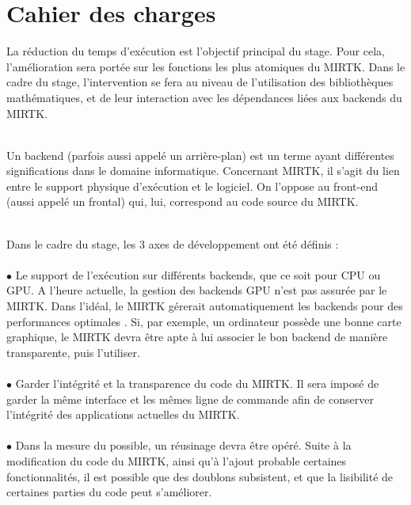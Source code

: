 \documentclass[10pt]{report}
\begin{document}
	
	
	\section{Cahier des charges}
	La réduction du temps d'exécution est l'objectif principal du stage. Pour cela, l'amélioration sera portée sur les fonctions les plus atomiques du MIRTK. Dans le cadre du stage, l'intervention se fera au niveau de l'utilisation des bibliothèques mathématiques, et de leur interaction avec les dépendances liées aux backends du MIRTK.\\ ~\par
	
	Un backend (parfois aussi appelé un arrière-plan) est un terme ayant différentes significations dans le domaine informatique. Concernant MIRTK, il s'agit du lien entre le support physique d'exécution et le logiciel. On l'oppose au front-end (aussi appelé un frontal) qui, lui, correspond au code source du MIRTK. \\ ~\par
	
	Dans le cadre du stage, les 3 axes de développement ont été définis : \\
	\\{$\bullet$} Le support de l'exécution sur différents backends, que ce soit pour CPU ou GPU. A l'heure actuelle, la gestion des backends GPU n'est pas assurée par le MIRTK. Dans l'idéal, le MIRTK gérerait automatiquement les backends  pour des performances optimales . Si, par exemple, un ordinateur possède une bonne carte graphique, le MIRTK devra être apte à lui associer le bon backend de manière transparente, puis l'utiliser.\\
	\\{$\bullet$} Garder l'intégrité et la transparence du code du MIRTK. Il sera imposé de garder la même interface et les mêmes ligne de commande afin de conserver l'intégrité des applications actuelles du MIRTK.  \\
	\\{$\bullet$} Dans la mesure du possible, un réusinage devra être opéré. Suite à la modification du code du MIRTK, ainsi qu'à l'ajout probable certaines fonctionnalités, il est possible que des doublons subsistent, et que la lisibilité de certaines parties du code peut s'améliorer.	
\end{document}
